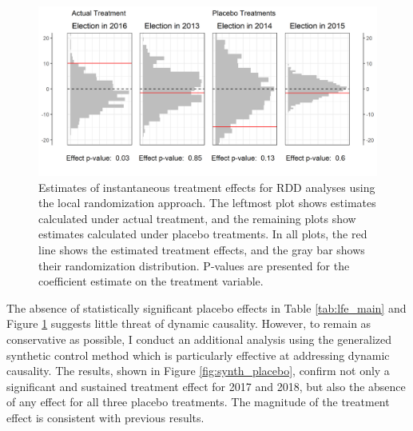 \documentclass[12pt]{article}
\newcommand{\1}{\mathbbm{1}}
\begin{document}
\begin{figure}[!htbp]
	\centering
	\includegraphics[width=\textwidth]{figure/190529_rdd_results.png}
	\captionsetup{singlelinecheck=off}
	\caption[Estimated RDD treatment effects]{Estimates of instantaneous treatment effects for RDD analyses using the local randomization approach. The leftmost plot shows estimates calculated under actual treatment, and the remaining plots show estimates calculated under placebo treatments. In all plots, the red line shows the estimated treatment effects, and the gray bar shows their randomization distribution. P-values are presented for the coefficient estimate on the treatment variable.}
	\label{fig:rdd_placebo}
\end{figure}

The absence of statistically significant placebo effects in Table \ref{tab:lfe_main} and Figure \ref{fig:rdd_placebo} suggests little threat of dynamic causality. However, to remain as conservative as possible, I conduct an additional analysis using the generalized synthetic control method \cite{Xu2017gsynth} which is particularly effective at addressing dynamic causality. The results, shown in Figure \ref{fig:synth_placebo}, confirm not only a significant and sustained treatment effect for 2017 and 2018, but also the absence of any effect for all three placebo treatments. The magnitude of the treatment effect is consistent with previous results.
\end{document}
